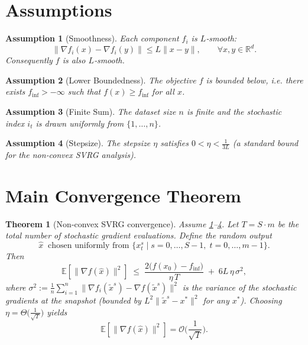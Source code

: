 \documentclass{article}
\newtheorem{theorem}{Theorem}
\newtheorem{assumption}{Assumption}
\begin{document}
\section*{Assumptions}
\begin{assumption}[Smoothness]\label{ass:smooth}
Each component $f_i$ is $L$‑smooth:
\[
\|\nabla f_i(x)-\nabla f_i(y)\|\le L\|x-y\|,\qquad\forall x,y\in\mathbb{R}^d.
\]
Consequently $f$ is also $L$‑smooth.
\end{assumption}
\begin{assumption}[Lower Boundedness]\label{ass:lb}
The objective $f$ is bounded below, i.e. there exists $f_{\inf}>-\infty$ such that $f(x)\ge f_{\inf}$ for all $x$.
\end{assumption}
\begin{assumption}[Finite Sum]\label{ass:finite}
The dataset size $n$ is finite and the stochastic index $i_t$ is drawn uniformly from $\{1,\dots,n\}$.
\end{assumption}
\begin{assumption}[Stepsize]\label{ass:stepsize}
The stepsize $\eta$ satisfies $0<\eta<\tfrac{1}{3L}$ (a standard bound for the non‑convex SVRG analysis).
\end{assumption}

\section*{Main Convergence Theorem}
\begin{theorem}[Non‑convex SVRG convergence]\label{thm:svrg}
Assume \ref{ass:smooth}–\ref{ass:stepsize}. Let $T=S\cdot m$ be the total number of stochastic gradient evaluations. Define the random output
\[
\hat{x}\;\; \text{chosen uniformly from }\{x_{t}^{s}\mid s=0,\dots,S-1,\;t=0,\dots,m-1\}.
\]
Then
\[
\mathbb{E}\!\left[\|\nabla f(\hat{x})\|^{2}\right]\;\le\;
\frac{2\big(f(x_{0})-f_{\inf}\big)}{\eta\,T}
    \;+\; 6L\,\eta\,\sigma^{2},
\]
where $\sigma^{2}:=\frac{1}{n}\sum_{i=1}^{n}\|\nabla f_i(\tilde{x}^{s})-\nabla f(\tilde{x}^{s})\|^{2}$ is the variance of the stochastic gradients at the snapshot (bounded by $L^{2}\|\tilde{x}^{s}-x^{*}\|^{2}$ for any $x^{*}$).  
Choosing $\eta = \Theta\!\big(\tfrac{1}{\sqrt{T}}\big)$ yields
\[
\mathbb{E}\!\left[\|\nabla f(\hat{x})\|^{2}\right]=\mathcal{O}\!\Big(\frac{1}{\sqrt{T}}\Big).
\]
\end{theorem}
\end{document}
